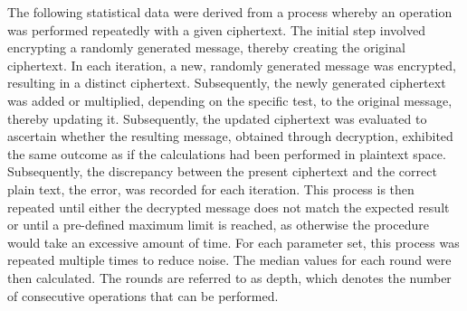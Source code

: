 The following statistical data were derived from a process whereby an operation was performed repeatedly with a given ciphertext. The initial step involved encrypting a randomly generated message, thereby creating the original ciphertext. In each iteration, a new, randomly generated message was encrypted, resulting in a distinct ciphertext. Subsequently, the newly generated ciphertext was added or multiplied, depending on the specific test, to the original message, thereby updating it. Subsequently, the updated ciphertext was evaluated to ascertain whether the resulting message, obtained through decryption, exhibited the same outcome as if the calculations had been performed in plaintext space. Subsequently, the discrepancy between the present ciphertext and the correct plain text, the error, was recorded for each iteration.
This process is then repeated until either the decrypted message does not match the expected result or until a pre-defined maximum limit is reached, as otherwise the procedure would take an excessive amount of time. For each parameter set, this process was repeated multiple times to reduce noise. The median values for each round were then calculated. The rounds are referred to as depth, which denotes the number of consecutive operations that can be performed.

